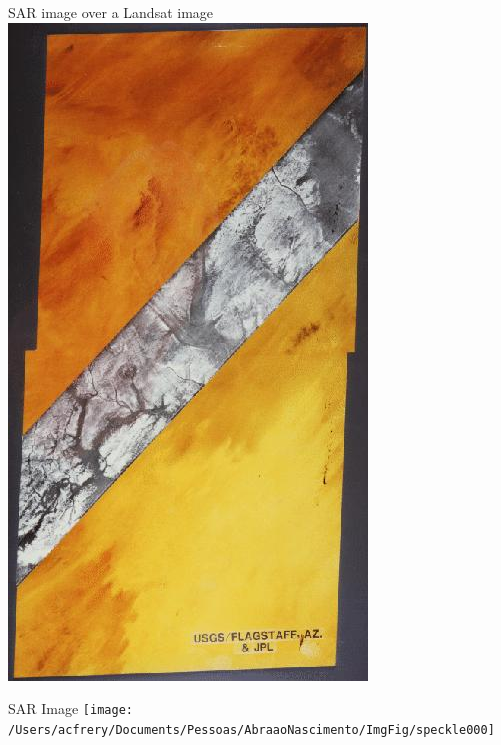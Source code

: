 \documentclass{beamer}
\begin{document}
\begin{frame}{SAR image over a Landsat image}
	\centering
	\includegraphics[angle=-90,width=\linewidth]{SARSaara}
\end{frame}

\begin{frame}{SAR Image}
	\centering
	\texttt{[image: /Users/acfrery/Documents/Pessoas/AbraaoNascimento/ImgFig/speckle000]}
\end{frame}
\end{document}
